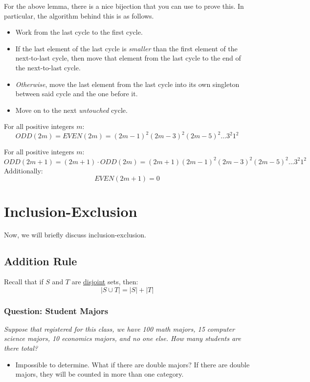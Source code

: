 \documentclass[letterpaper]{article}
\begin{document}
For the above lemma, there is a nice bijection that you can use to prove this. In particular, the algorithm behind this is as follows.
\begin{itemize}
    \item Work from the last cycle to the first cycle. 
    \item If the last element of the last cycle is \emph{smaller} than the first element of the next-to-last cycle, then move that element from the last cycle to the end of the next-to-last cycle. 
    \item \emph{Otherwise}, move the last element from the last cycle into its own singleton between said cycle and the one before it. 
    \item Move on to the next \emph{untouched} cycle. 
\end{itemize}

\begin{theorem}{}{}
    For all positive integers $m$:
    \[ODD(2m) = EVEN(2m) = (2m - 1)^2  (2m - 3)^2 (2m - 5)^2 \dots 3^2 1^2\]
\end{theorem}

\begin{theorem}{}{}
    For all positive integers $m$:
    \[ODD(2m + 1) = (2m + 1) \cdot ODD(2m) = (2m + 1) (2m - 1)^2 (2m - 3)^2 (2m - 5)^2 \dots 3^2 1^2\]
    Additionally:
    \[EVEN(2m + 1) = 0\]
\end{theorem}

\newpage 
\section{Inclusion-Exclusion}
Now, we will briefly discuss inclusion-exclusion.

\subsection{Addition Rule}
Recall that if $S$ and $T$ are \underline{disjoint} sets, then:
\[|S \cup T| = |S| + |T|\]

\subsubsection{Question: Student Majors}
\emph{Suppose that registered for this class, we have 100 math majors, 15 computer science majors, 10 economics majors, and no one else. How many students are there total?}
\begin{itemize}
    \item Impossible to determine. What if there are double majors? If there are double majors, they will be counted in more than one category. 
\end{itemize}
\end{document}
